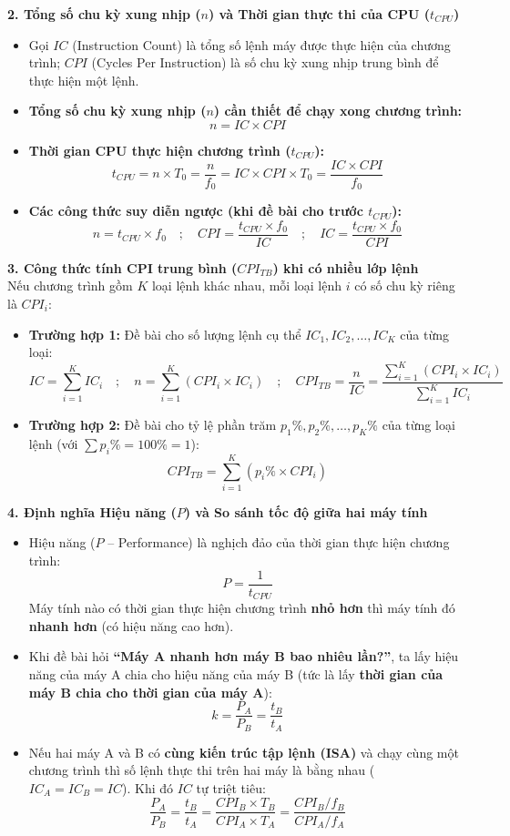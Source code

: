 \textbf{2. Tổng số chu kỳ xung nhịp ($n$) và Thời gian thực thi của CPU ($t_{CPU}$)}
\begin{itemize}
    \item Gọi $IC$ (Instruction Count) là tổng số lệnh máy được thực hiện của chương trình; $CPI$ (Cycles Per Instruction) là số chu kỳ xung nhịp trung bình để thực hiện một lệnh.
    \item \textbf{Tổng số chu kỳ xung nhịp ($n$) cần thiết để chạy xong chương trình:}
    $$n = IC \times CPI$$
    \item \textbf{Thời gian CPU thực hiện chương trình ($t_{CPU}$):}
    $$t_{CPU} = n \times T_0 = \frac{n}{f_0} = IC \times CPI \times T_0 = \frac{IC \times CPI}{f_0}$$
    \item \textbf{Các công thức suy diễn ngược (khi đề bài cho trước $t_{CPU}$):}
    $$n = t_{CPU} \times f_0 \quad ; \quad CPI = \frac{t_{CPU} \times f_0}{IC} \quad ; \quad IC = \frac{t_{CPU} \times f_0}{CPI}$$
\end{itemize}

\textbf{3. Công thức tính CPI trung bình ($CPI_{TB}$) khi có nhiều lớp lệnh}\\
Nếu chương trình gồm $K$ loại lệnh khác nhau, mỗi loại lệnh $i$ có số chu kỳ riêng là $CPI_i$:
\begin{itemize}
    \item \textbf{Trường hợp 1:} Đề bài cho số lượng lệnh cụ thể $IC_1, IC_2, \dots, IC_K$ của từng loại:
    $$IC = \sum_{i=1}^{K} IC_i \quad ; \quad n = \sum_{i=1}^{K} (CPI_i \times IC_i) \quad ; \quad CPI_{TB} = \frac{n}{IC} = \frac{\sum_{i=1}^{K} (CPI_i \times IC_i)}{\sum_{i=1}^{K} IC_i}$$
    \item \textbf{Trường hợp 2:} Đề bài cho tỷ lệ phần trăm $p_1\%, p_2\%, \dots, p_K\%$ của từng loại lệnh (với $\sum p_i\% = 100\% = 1$):
    $$CPI_{TB} = \sum_{i=1}^{K} (p_i\% \times CPI_i)$$
\end{itemize}

\textbf{4. Định nghĩa Hiệu năng ($P$) và So sánh tốc độ giữa hai máy tính}
\begin{itemize}
    \item Hiệu năng ($P$ -- Performance) là nghịch đảo của thời gian thực hiện chương trình:
    $$P = \frac{1}{t_{CPU}}$$
    Máy tính nào có thời gian thực hiện chương trình \textbf{nhỏ hơn} thì máy tính đó \textbf{nhanh hơn} (có hiệu năng cao hơn).
    \item Khi đề bài hỏi \textbf{``Máy A nhanh hơn máy B bao nhiêu lần?''}, ta lấy hiệu năng của máy A chia cho hiệu năng của máy B (tức là lấy \textbf{thời gian của máy B chia cho thời gian của máy A}):
    $$k = \frac{P_A}{P_B} = \frac{t_B}{t_A}$$
    \item Nếu hai máy A và B có \textbf{cùng kiến trúc tập lệnh (ISA)} và chạy cùng một chương trình thì số lệnh thực thi trên hai máy là bằng nhau ($IC_A = IC_B = IC$). Khi đó $IC$ tự triệt tiêu:
    $$\frac{P_A}{P_B} = \frac{t_B}{t_A} = \frac{CPI_B \times T_B}{CPI_A \times T_A} = \frac{CPI_B / f_B}{CPI_A / f_A}$$
\end{itemize}

